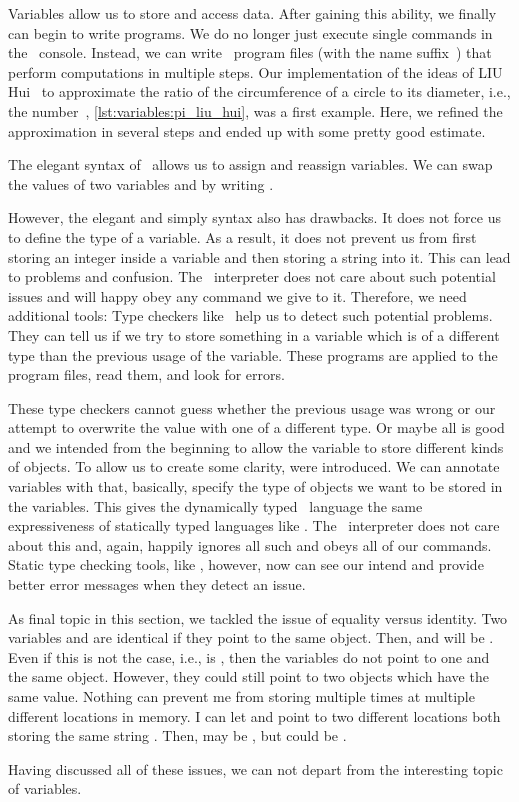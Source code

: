 %
%
Variables allow us to store and access data.
After gaining this ability, we finally can begin to write  programs.
We do no longer just execute single commands in the \python\ console.
Instead, we can write \python\ program files (with the name suffix~) that perform computations in multiple steps.
Our implementation of the ideas of LIU Hui~ to approximate the ratio of the circumference of a circle to its diameter, i.e., the number~\numberPi, \cref{lst:variables:pi_liu_hui}, was a first example.
Here, we refined the approximation in several steps and ended up with some pretty good estimate.

The elegant syntax of \python\ allows us to assign and reassign variables.
We can swap the values of two variables  and  by writing .

However, the elegant and simply syntax also has drawbacks.
It does not force us to define the type of a variable.
As a result, it does not prevent us from first storing an integer inside a variable and then storing a string into it.
This can lead to problems and confusion.
The \python\ interpreter does not care about such potential issues and will happy obey any command we give to it.
Therefore, we need additional tools:
Type checkers like \mypy\ help us to detect such potential problems.
They can tell us if we try to store something in a variable which is of a different type than the previous usage of the variable.
These programs are applied to the program files, read them, and look for errors.

These type checkers cannot guess whether the previous usage was wrong or our attempt to overwrite the value with one of a different type.
Or maybe all is good and we intended from the beginning to allow the variable to store different kinds of objects.
To allow us to create some clarity,  were introduced.
We can annotate variables with  that, basically, specify the type of objects we want to be stored in the variables.
This gives the dynamically typed \python\ language the same expressiveness of statically typed languages like .
The \python\ interpreter does not care about this and, again, happily ignores all such  and obeys all of our commands.
Static type checking tools, like \mypy, however, now can see our intend and provide better error messages when they detect an issue.

As final topic in this section, we tackled the issue of equality versus identity.
Two variables  and  are identical if they point to the same object.
Then,  and  will be .
Even if this is not the case, i.e.,  is , then the variables do not point to one and the same object.
However, they could still point to two objects which have the same value.
Nothing can prevent me from storing  multiple times at multiple different locations in memory.
I can let  and  point to two different locations both storing the same string .
Then,  may be , but  could be .

Having discussed all of these issues, we can not depart from the interesting topic of variables.%
%
\endhsection%
%
